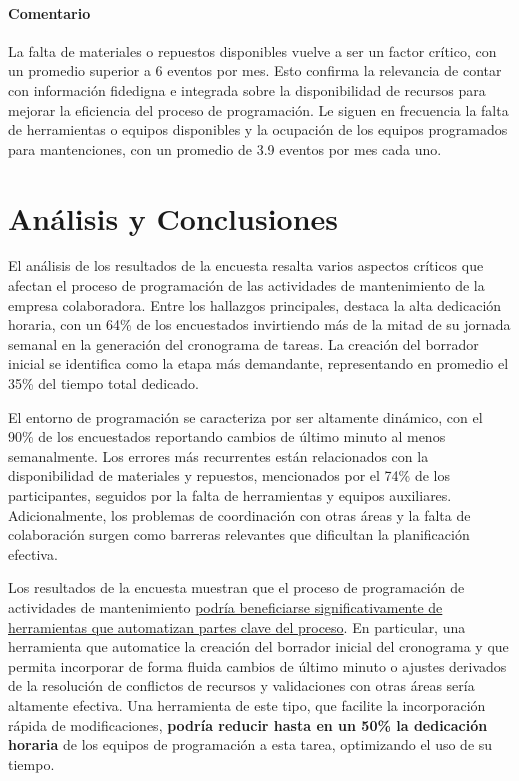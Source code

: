 \documentclass{article}
\begin{document}
\begin{appendix}
    \paragraph{Comentario}La falta de materiales o repuestos disponibles vuelve a ser un factor crítico, con un promedio superior a 6 eventos por mes. Esto confirma la relevancia de contar con información fidedigna e integrada sobre la disponibilidad de recursos para mejorar la eficiencia del proceso de programación. Le siguen en frecuencia la falta de herramientas o equipos disponibles y la ocupación de los equipos programados para mantenciones, con un promedio de 3.9 eventos por mes cada uno.
    
    \section*{Análisis y Conclusiones}
    
    El análisis de los resultados de la encuesta resalta varios aspectos críticos que afectan el proceso de programación de las actividades de mantenimiento de la empresa colaboradora. Entre los hallazgos principales, destaca la alta dedicación horaria, con un 64\% de los encuestados invirtiendo más de la mitad de su jornada semanal en la generación del cronograma de tareas. La creación del borrador inicial se identifica como la etapa más demandante, representando en promedio el 35\% del tiempo total dedicado.
    
    El entorno de programación se caracteriza por ser altamente dinámico, con el 90\% de los encuestados reportando cambios de último minuto al menos semanalmente. Los errores más recurrentes están relacionados con la disponibilidad de materiales y repuestos, mencionados por el 74\% de los participantes, seguidos por la falta de herramientas y equipos auxiliares. Adicionalmente, los problemas de coordinación con otras áreas y la falta de colaboración surgen como barreras relevantes que dificultan la planificación efectiva.
    
    Los resultados de la encuesta muestran que el proceso de programación de actividades de mantenimiento \uline{podría beneficiarse significativamente de herramientas que automatizan partes clave del proceso}. En particular, una herramienta que automatice la creación del borrador inicial del cronograma y que permita incorporar de forma fluida cambios de último minuto o ajustes derivados de la resolución de conflictos de recursos y validaciones con otras áreas sería altamente efectiva. Una herramienta de este tipo, que facilite la incorporación rápida de modificaciones, \textbf{podría reducir hasta en un 50\% la dedicación horaria} de los equipos de programación a esta tarea, optimizando el uso de su tiempo.
    

\end{appendix}
\end{document}
